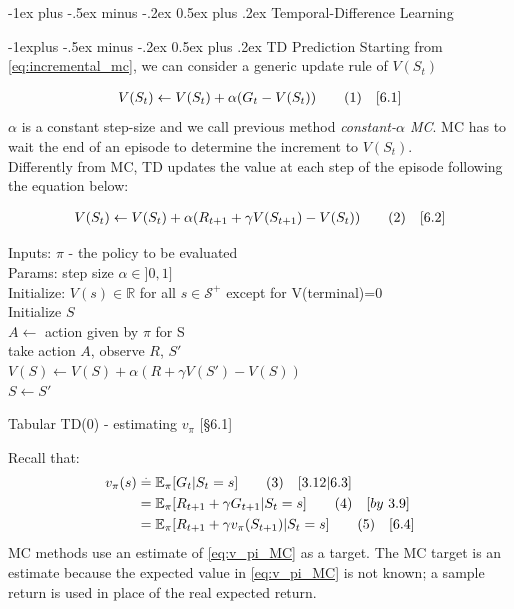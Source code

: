 \documentclass[10pt,landscape]{article}
\makeatletter
\renewcommand{\section}{\@startsection{section}{1}{0mm}%
                                {-1ex plus -.5ex minus -.2ex}%
                                {0.5ex plus .2ex}%
                                {\normalfont\large\bfseries}}
\renewcommand{\subsection}{\@startsection{subsection}{2}{0mm}%
                                {-1explus -.5ex minus -.2ex}%
                                {0.5ex plus .2ex}%
                                {\normalfont\normalsize\bfseries}}
\newcommand\numberthis{\addtocounter{equation}{1}\tag{\theequation}}
\makeatother
\begin{document}
\begin{multicols}{3}

\section{Temporal-Difference Learning}

\subsection{TD Prediction}
Starting from \ref{eq:incremental_mc}, we can consider a generic update rule of $V(S_t)$

\begin{align*}
V(S_t) \leftarrow V(S_t) + \alpha (G_t - V(S_t)) \label{eq:constant_alpha_mc}\numberthis \quad [6.1]
\end{align*}
$\alpha$ is a constant step-size and we call previous method \emph{constant-$\alpha$ MC}.
MC has to wait the end of an episode to determine the increment to $V(S_t)$. \\
Differently from MC, TD updates the value at each step of the episode following the equation below:

\begin{align*}
V(S_t) \leftarrow V(S_t) + \alpha (R_{t+1} + \gamma V(S_{t+1}) - V(S_t)) \label{eq:td_0}\numberthis \quad [6.2]
\end{align*}

\begin{algorithm}[H]
Inputs: $\pi$ - the policy to be evaluated \\
Params: step size $\alpha \in ]0,1]$ \\
Initialize: $V(s) \in \mathbb{R}$ for all $s \in \mathcal{S}^+$ except for V(terminal)=0 \\

{
    Initialize $S$\\
    {
    	$A \leftarrow$ action given by $\pi$ for S\\
    	take action $A$, observe $R$, $S'$\\
    	$V(S) \leftarrow V(S) + \alpha (R + \gamma V(S') - V(S))$ \\
    	$S \leftarrow S'$   
    }
 }
\caption{Tabular TD(0) - estimating $v_{\pi}$ [§6.1]}
\end{algorithm}

Recall that:
\begin{align*}
v_{\pi}(s) & \stackrel{.}{=} \mathbb{E}_{\pi}[G_t | S_t = s]  \label{eq:v_pi_MC} \numberthis  \quad [3.12 | 6.3]\\
& = \mathbb{E}_{\pi}[R_{t+1} + \gamma G_{t+1} | S_t = s] \label{eq:v_pi_MC2}  \numberthis  \quad [by \ 3.9] \\
& = \mathbb{E}_{\pi}[R_{t+1} + \gamma v_{\pi}(S_{t+1}) | S_t = s] \label{eq:v_pi_TD} \numberthis  \quad [6.4] \\
\end{align*}
MC methods use an estimate of  \ref{eq:v_pi_MC} as a target. 
The MC target is an estimate because the expected value in \ref{eq:v_pi_MC} is not known; a sample return is used in place of the real expected return.\\


\end{multicols}
\end{document}
